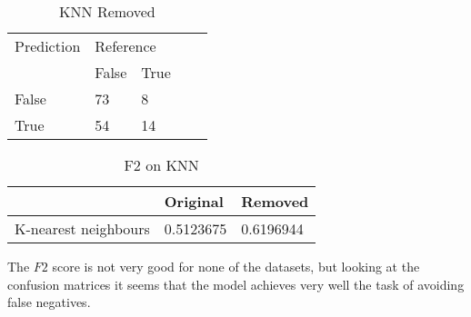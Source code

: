 \begin{table}[!htbp]
\centering
\caption{KNN Removed}
\vspace{0.1cm}
\label{knn-remov}
\begin{tabular}{|l|ll|ll}
\cline{1-3}
Prediction & \multicolumn{2}{l|}{Reference} &  &  \\
           & False          & True          &  &  \\ \cline{2-3}
False      & 73              & 8             &  &  \\
True       & 54              & 14             &  &  \\ \cline{1-3}
\end{tabular}
\end{table}

\begin{table}[!htbp]
\centering
\caption{F2 on KNN}
\vspace{0.1cm}
\label{knn-f2}
\begin{tabular}{|l|l|l|}
\hline
      & Original & Removed \\ \hline
K-nearest neighbours & 0.5123675 & 0.6196944          \\ \hline
\end{tabular}
\end{table}


The $F2$ score is not very good for none of the datasets, but looking at the confusion matrices it seems that the model achieves very well the task of avoiding false negatives.



